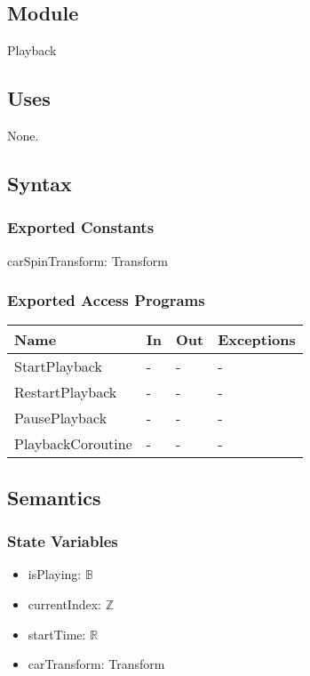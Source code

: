 \documentclass[12pt, titlepage]{article}
\begin{document}
\subsection{Module}

Playback

\subsection{Uses}
None.

\subsection{Syntax}

\subsubsection{Exported Constants}
carSpinTransform: Transform

\subsubsection{Exported Access Programs}

\begin{center}
\begin{tabular}{p{4cm} p{4cm} p{4cm} p{2cm}}
\hline
\textbf{Name} & \textbf{In} & \textbf{Out} & \textbf{Exceptions} \\
\hline
StartPlayback & - & - & - \\
RestartPlayback & - & - & - \\
PausePlayback & - & - & - \\
PlaybackCoroutine & - & - & - \\
\hline
\end{tabular}
\end{center}

\subsection{Semantics}

\subsubsection{State Variables}

\begin{itemize}
  \item isPlaying: $\mathbb{B}$
  \item currentIndex: $\mathbb{Z}$
  \item startTime: $\mathbb{R}$ 
  \item carTransform: Transform
\end{itemize}
\end{document}
